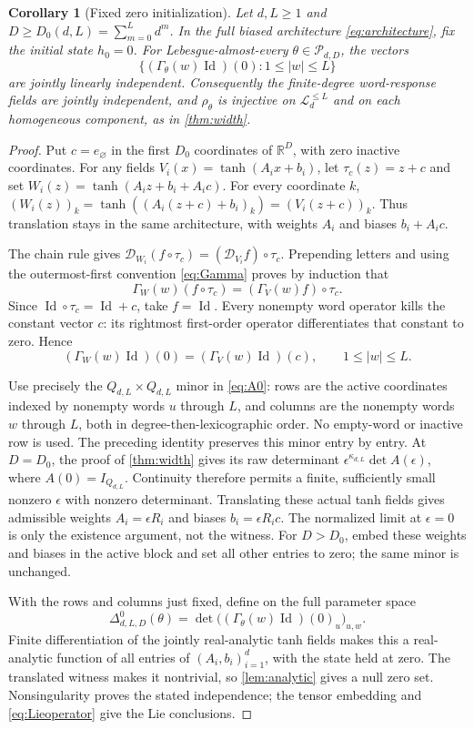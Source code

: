 \documentclass[11pt,a4paper]{article}
\numberwithin{equation}{section}
\newtheorem{corollary}[theorem]{Corollary}
\theoremstyle{definition}
\theoremstyle{remark}
\DeclareMathOperator{\Id}{Id}
\newcommand{\R}{\mathbb R}
\newcommand{\Lie}{\mathcal L}
\newcommand{\Dop}{\mathcal D}
\begin{document}
\begin{corollary}[Fixed zero initialization]\label{cor:zero}
Let $d,L\geq1$ and $D\geq D_0(d,L)=\sum_{m=0}^L d^m$. In the full
biased architecture \eqref{eq:architecture}, fix the initial state $h_0=0$.
For Lebesgue-almost-every $\theta\in\mathcal P_{d,D}$, the vectors
\[
 \{(\Gamma_\theta(w)\Id)(0):1\leq|w|\leq L\}
\]
are jointly linearly independent. Consequently the finite-degree
word-response fields are jointly independent, and $\rho_\theta$ is
injective on $\Lie_d^{\leq L}$ and on each homogeneous component, as in
\cref{thm:width}.
\end{corollary}
\begin{proof}
Put $c=e_{\varnothing}$ in the first $D_0$ coordinates of $\R^D$,
with zero inactive coordinates. For any fields
$V_i(x)=\tanh(A_ix+b_i)$, let $\tau_c(z)=z+c$ and set
$W_i(z)=\tanh(A_iz+b_i+A_ic)$.
For every coordinate $k$,
$(W_i(z))_k=\tanh((A_i(z+c)+b_i)_k)=(V_i(z+c))_k$.
Thus translation stays in the same architecture, with weights $A_i$
and biases $b_i+A_ic$.

The chain rule gives
$\Dop_{W_i}(f\circ\tau_c)=(\Dop_{V_i}f)\circ\tau_c$.
Prepending letters and using the outermost-first convention
\eqref{eq:Gamma} proves by induction that
\[
 \Gamma_W(w)(f\circ\tau_c)=(\Gamma_V(w)f)\circ\tau_c.
\]
Since $\Id\circ\tau_c=\Id+c$, take $f=\Id$. Every nonempty word
operator kills the constant vector $c$: its rightmost first-order
operator differentiates that constant to zero. Hence
\[
 (\Gamma_W(w)\Id)(0)=(\Gamma_V(w)\Id)(c),
 \qquad 1\leq|w|\leq L.
\]

Use precisely the $Q_{d,L}\times Q_{d,L}$ minor in \eqref{eq:A0}:
rows are the active coordinates indexed by nonempty words $u$ through
$L$, and columns are the nonempty words $w$ through $L$, both in
degree-then-lexicographic order. No empty-word or inactive row is used.
The preceding identity preserves this minor entry by entry.
At $D=D_0$, the proof of \cref{thm:width} gives its raw determinant
$\epsilon^{\kappa_{d,L}}\det A(\epsilon)$, where $A(0)=I_{Q_{d,L}}$.
Continuity therefore permits a finite, sufficiently small nonzero
$\epsilon$ with nonzero determinant. Translating these actual tanh
fields gives admissible weights $A_i=\epsilon R_i$ and biases
$b_i=\epsilon R_ic$. The normalized limit at $\epsilon=0$ is only the
existence argument, not the witness. For $D>D_0$, embed these weights
and biases in the active block and set all other entries to zero;
the same minor is unchanged.

With the rows and columns just fixed, define on the full parameter space
\[
 \Delta^0_{d,L,D}(\theta)
 =\det\bigl((\Gamma_\theta(w)\Id)(0)_u\bigr)_{u,w}.
\]
Finite differentiation of the jointly real-analytic tanh fields makes
this a real-analytic function of all entries of $(A_i,b_i)_{i=1}^d$,
with the state held at zero. The translated witness makes it nontrivial,
so \cref{lem:analytic} gives a null zero set. Nonsingularity proves the
stated independence; the tensor embedding and \eqref{eq:Lieoperator}
give the Lie conclusions.


\end{proof}
\end{document}
